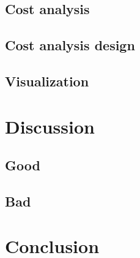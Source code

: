\documentclass [11pt]{report}
\begin{document}
\section{Cost analysis}
\section{Cost analysis design}
\section{Visualization}
\chapter{Discussion}
\section{Good}
\section{Bad}
\chapter{Conclusion}


\end{document}

